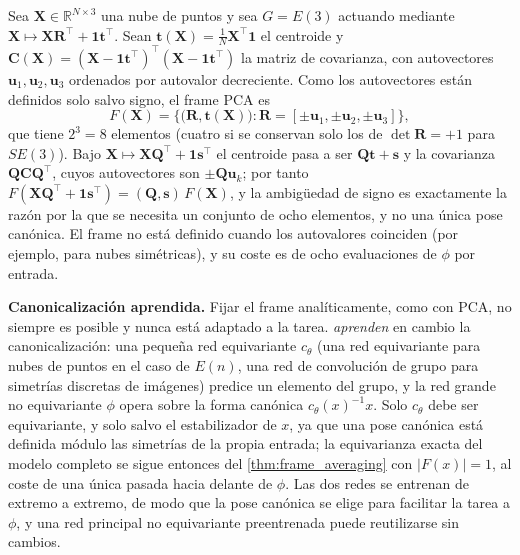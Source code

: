 \begin{example}\label{ex:frame_pca}
Sea $\mathbf{X} \in \mathbb{R}^{N \times 3}$ una nube de puntos y sea $G = E(3)$ actuando mediante $\mathbf{X} \mapsto \mathbf{X}\mathbf{R}^{\top} + \mathbf{1}\mathbf{t}^{\top}$. Sean $\mathbf{t}(\mathbf{X}) = \frac{1}{N}\mathbf{X}^{\top}\mathbf{1}$ el centroide y $\mathbf{C}(\mathbf{X}) = (\mathbf{X} - \mathbf{1}\mathbf{t}^{\top})^{\top}(\mathbf{X} - \mathbf{1}\mathbf{t}^{\top})$ la matriz de covarianza, con autovectores $\mathbf{u}_1, \mathbf{u}_2, \mathbf{u}_3$ ordenados por autovalor decreciente. Como los autovectores están definidos solo salvo signo, el frame \gls{PCA} es
\[F(\mathbf{X}) = \Big\{ \big(\mathbf{R}, \mathbf{t}(\mathbf{X})\big) : \mathbf{R} = [\pm\mathbf{u}_1, \pm\mathbf{u}_2, \pm\mathbf{u}_3] \Big\},\]
que tiene $2^3 = 8$ elementos (cuatro si se conservan solo los de $\det \mathbf{R} = +1$ para $SE(3)$). Bajo $\mathbf{X} \mapsto \mathbf{X}\mathbf{Q}^{\top} + \mathbf{1}\mathbf{s}^{\top}$ el centroide pasa a ser $\mathbf{Q}\mathbf{t} + \mathbf{s}$ y la covarianza $\mathbf{Q}\mathbf{C}\mathbf{Q}^{\top}$, cuyos autovectores son $\pm\mathbf{Q}\mathbf{u}_k$; por tanto $F(\mathbf{X}\mathbf{Q}^{\top} + \mathbf{1}\mathbf{s}^{\top}) = (\mathbf{Q}, \mathbf{s})\,F(\mathbf{X})$, y la ambigüedad de signo es exactamente la razón por la que se necesita un conjunto de ocho elementos, y no una única pose canónica. El frame no está definido cuando los autovalores coinciden (por ejemplo, para nubes simétricas), y su coste es de ocho evaluaciones de $\phi$ por entrada.
\end{example}

\textbf{Canonicalización aprendida.} Fijar el frame analíticamente, como con \gls{PCA}, no siempre es posible y nunca está adaptado a la tarea. \citet{kaba2023canonicalization} \emph{aprenden} en cambio la canonicalización: una pequeña red equivariante $c_\theta$ (una red equivariante para nubes de puntos en el caso de $E(n)$, una red de convolución de grupo para simetrías discretas de imágenes) predice un elemento del grupo, y la red grande no equivariante $\phi$ opera sobre la forma canónica $c_\theta(x)^{-1}x$. Solo $c_\theta$ debe ser equivariante, y solo salvo el estabilizador de $x$, ya que una pose canónica está definida módulo las simetrías de la propia entrada; la equivarianza exacta del modelo completo se sigue entonces del \autoref{thm:frame_averaging} con $|F(x)| = 1$, al coste de una única pasada hacia delante de $\phi$. Las dos redes se entrenan de extremo a extremo, de modo que la pose canónica se elige para facilitar la tarea a $\phi$, y una red principal no equivariante preentrenada puede reutilizarse sin cambios.

